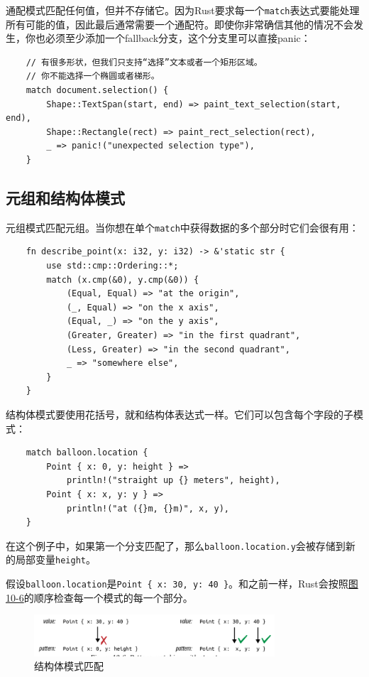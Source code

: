 通配模式匹配任何值，但并不存储它。因为Rust要求每一个\texttt{match}表达式要能处理所有可能的值，因此最后通常需要一个通配符。即使你非常确信其他的情况不会发生，你也必须至少添加一个fallback分支，这个分支里可以直接panic：
\begin{verbatim}
    // 有很多形状，但我们只支持“选择”文本或者一个矩形区域。
    // 你不能选择一个椭圆或者梯形。
    match document.selection() {
        Shape::TextSpan(start, end) => paint_text_selection(start, end),
        Shape::Rectangle(rect) => paint_rect_selection(rect),
        _ => panic!("unexpected selection type"),
    }
\end{verbatim}

\subsection{元组和结构体模式}
元组模式匹配元组。当你想在单个\texttt{match}中获得数据的多个部分时它们会很有用：
\begin{verbatim}
    fn describe_point(x: i32, y: i32) -> &'static str {
        use std::cmp::Ordering::*;
        match (x.cmp(&0), y.cmp(&0)) {
            (Equal, Equal) => "at the origin",
            (_, Equal) => "on the x axis",
            (Equal, _) => "on the y axis",
            (Greater, Greater) => "in the first quadrant",
            (Less, Greater) => "in the second quadrant",
            _ => "somewhere else",
        }
    }
\end{verbatim}

结构体模式要使用花括号，就和结构体表达式一样。它们可以包含每个字段的子模式：
\begin{verbatim}
    match balloon.location {
        Point { x: 0, y: height } =>
            println!("straight up {} meters", height),
        Point { x: x, y: y } =>
            println!("at ({}m, {}m)", x, y),
    }
\end{verbatim}

在这个例子中，如果第一个分支匹配了，那么\texttt{balloon.location.y}会被存储到新的局部变量\texttt{height}。

假设\texttt{balloon.location}是\texttt{Point \{ x: 30, y: 40 \}}。和之前一样，Rust会按照\hyperref[f10-6]{图10-6}的顺序检查每一个模式的每一个部分。

\begin{figure}[htbp]
    \centering
    \includegraphics[width=0.8\textwidth]{../img/f10-6.png}
    \caption{结构体模式匹配}
    \label{f10-6}
\end{figure}

